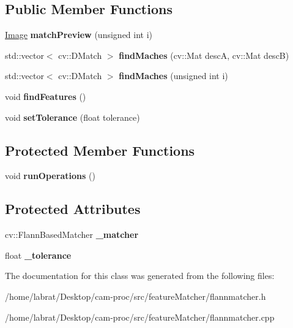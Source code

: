 \subsection*{Public Member Functions}
\begin{DoxyCompactItemize}
\item 
\hyperlink{classImage}{Image} {\bfseries match\+Preview} (unsigned int i)\hypertarget{classFlannMatcher_a37b2e9dbfff55df6acea295e333ae33d}{}\label{classFlannMatcher_a37b2e9dbfff55df6acea295e333ae33d}

\item 
std\+::vector$<$ cv\+::\+D\+Match $>$ {\bfseries find\+Maches} (cv\+::\+Mat descA, cv\+::\+Mat descB)\hypertarget{classFlannMatcher_ac7540ea9a30c3b87d14d39a5ba130266}{}\label{classFlannMatcher_ac7540ea9a30c3b87d14d39a5ba130266}

\item 
std\+::vector$<$ cv\+::\+D\+Match $>$ {\bfseries find\+Maches} (unsigned int i)\hypertarget{classFlannMatcher_a0d1ed99600a58b8da8a9dabf8fb22eab}{}\label{classFlannMatcher_a0d1ed99600a58b8da8a9dabf8fb22eab}

\item 
void {\bfseries find\+Features} ()\hypertarget{classFlannMatcher_aa9610e702c5d0ed9e1565ad0e514afd1}{}\label{classFlannMatcher_aa9610e702c5d0ed9e1565ad0e514afd1}

\item 
void {\bfseries set\+Tolerance} (float tolerance)\hypertarget{classFlannMatcher_a42ddfde49e5cbda63ab8d5efbd1b8600}{}\label{classFlannMatcher_a42ddfde49e5cbda63ab8d5efbd1b8600}

\end{DoxyCompactItemize}
\subsection*{Protected Member Functions}
\begin{DoxyCompactItemize}
\item 
void {\bfseries run\+Operations} ()\hypertarget{classFlannMatcher_a67308488c12bbd3408b4aca3016e66a1}{}\label{classFlannMatcher_a67308488c12bbd3408b4aca3016e66a1}

\end{DoxyCompactItemize}
\subsection*{Protected Attributes}
\begin{DoxyCompactItemize}
\item 
cv\+::\+Flann\+Based\+Matcher {\bfseries \+\_\+matcher}\hypertarget{classFlannMatcher_a187d368edc6a237718516f3010cc7bf9}{}\label{classFlannMatcher_a187d368edc6a237718516f3010cc7bf9}

\item 
float {\bfseries \+\_\+tolerance}\hypertarget{classFlannMatcher_a60a1d4356fec7c52f888a17729d11270}{}\label{classFlannMatcher_a60a1d4356fec7c52f888a17729d11270}

\end{DoxyCompactItemize}


The documentation for this class was generated from the following files\+:\begin{DoxyCompactItemize}
\item 
/home/labrat/\+Desktop/cam-\/proc/src/feature\+Matcher/flannmatcher.\+h\item 
/home/labrat/\+Desktop/cam-\/proc/src/feature\+Matcher/flannmatcher.\+cpp\end{DoxyCompactItemize}
